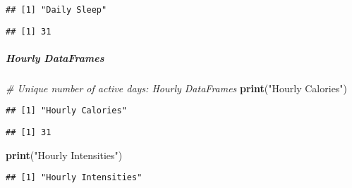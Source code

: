 \documentclass[
]{article}
\newenvironment{Shaded}{\begin{snugshade}}{\end{snugshade}}
\newcommand{\CommentTok}[1]{\textcolor[rgb]{0.56,0.35,0.01}{\textit{#1}}}
\newcommand{\FunctionTok}[1]{\textcolor[rgb]{0.13,0.29,0.53}{\textbf{#1}}}
\newcommand{\NormalTok}[1]{#1}
\newcommand{\SpecialCharTok}[1]{\textcolor[rgb]{0.81,0.36,0.00}{\textbf{#1}}}
\newcommand{\StringTok}[1]{\textcolor[rgb]{0.31,0.60,0.02}{#1}}
\begin{document}
\begin{verbatim}
## [1] "Daily Sleep"
\end{verbatim}

\begin{Shaded}
\end{Shaded}

\begin{verbatim}
## [1] 31
\end{verbatim}

\hypertarget{hourly-dataframes-3}{%
\subparagraph{Hourly DataFrames}\label{hourly-dataframes-3}}

\begin{Shaded}
\begin{Highlighting}[]
\CommentTok{\# Unique number of active days: Hourly DataFrames}
\FunctionTok{print}\NormalTok{(}\StringTok{"Hourly Calories"}\NormalTok{)}
\end{Highlighting}
\end{Shaded}

\begin{verbatim}
## [1] "Hourly Calories"
\end{verbatim}

\begin{Shaded}
\end{Shaded}

\begin{verbatim}
## [1] 31
\end{verbatim}

\begin{Shaded}
\begin{Highlighting}[]
\FunctionTok{print}\NormalTok{(}\StringTok{"Hourly Intensities"}\NormalTok{)}
\end{Highlighting}
\end{Shaded}

\begin{verbatim}
## [1] "Hourly Intensities"
\end{verbatim}

\begin{Shaded}
\end{Shaded}
\end{document}

